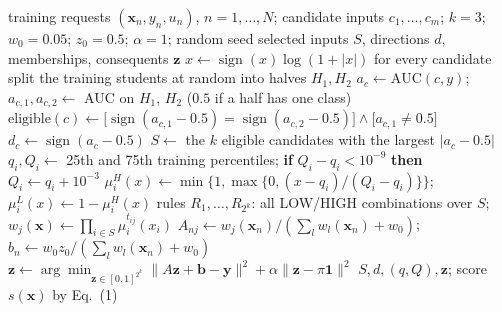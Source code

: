 


\setcounter{algorithm}{1}
\begin{algorithm}[H]
\caption{SC-TSK: sign-checked construction of a zero-order TSK rule base}
\begin{algorithmic}[1]
\Require training requests $(\mathbf{x}_n, y_n, u_n)$, $n = 1,\dots,N$; candidate inputs $c_1,\dots,c_m$; $k = 3$; $w_0 = 0.05$; $z_0 = 0.5$; $\alpha = 1$; random seed
\Ensure selected inputs $S$, directions $d$, memberships, consequents $\mathbf{z}$
\State $x \gets \operatorname{sign}(x)\log(1 + |x|)$ for every candidate
\State split the training students at random into halves $H_1, H_2$
  \State $a_c \gets \mathrm{AUC}(c, y)$;\; $a_{c,1}, a_{c,2} \gets$ AUC on $H_1$, $H_2$ ($0.5$ if a half has one class)
  \State $\mathrm{eligible}(c) \gets \big[\operatorname{sign}(a_{c,1} - 0.5) = \operatorname{sign}(a_{c,2} - 0.5)\big] \wedge \big[a_{c,1} \neq 0.5\big]$ 
  \State $d_c \gets \operatorname{sign}(a_c - 0.5)$
\EndFor
\State $S \gets$ the $k$ eligible candidates with the largest $|a_c - 0.5|$
  \State $q_i, Q_i \gets$ 25th and 75th training percentiles; \textbf{if} $Q_i - q_i < 10^{-9}$ \textbf{then} $Q_i \gets q_i + 10^{-3}$
  \State $\mu^{H}_i(x) \gets \min\{1, \max\{0, (x - q_i)/(Q_i - q_i)\}\}$;\; $\mu^{L}_i(x) \gets 1 - \mu^{H}_i(x)$
\EndFor
\State rules $R_1,\dots,R_{2^k}$: all LOW/HIGH combinations over $S$; $w_j(\mathbf{x}) \gets \prod_{i \in S} \mu^{t_{ij}}_i(x_i)$
\State $A_{nj} \gets w_j(\mathbf{x}_n)/(\sum_l w_l(\mathbf{x}_n) + w_0)$;\; $b_n \gets w_0 z_0/(\sum_l w_l(\mathbf{x}_n) + w_0)$
\State $\mathbf{z} \gets \arg\min_{\mathbf{z} \in [0,1]^{2^k}} \|A\mathbf{z} + \mathbf{b} - \mathbf{y}\|^2 + \alpha\|\mathbf{z} - \pi\mathbf{1}\|^2$ 
\State \Return $S, d, (q, Q), \mathbf{z}$; score $s(\mathbf{x})$ by Eq.~(1)
\end{algorithmic}
\end{algorithm}


